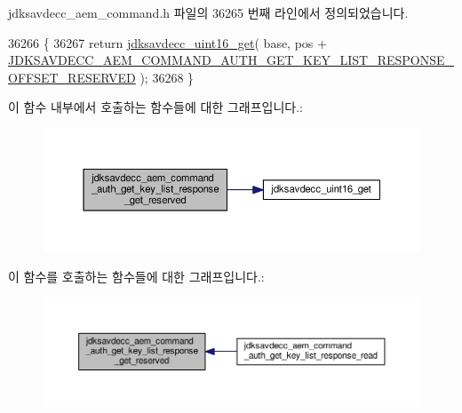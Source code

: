 jdksavdecc\+\_\+aem\+\_\+command.\+h 파일의 36265 번째 라인에서 정의되었습니다.


\begin{DoxyCode}
36266 \{
36267     \textcolor{keywordflow}{return} \hyperlink{group__endian_ga3fbbbc20be954aa61e039872965b0dc9}{jdksavdecc\_uint16\_get}( base, pos + 
      \hyperlink{group__command__auth__get__key__list__response_gac34c30ffeaf37c7057072f996929f1e6}{JDKSAVDECC\_AEM\_COMMAND\_AUTH\_GET\_KEY\_LIST\_RESPONSE\_OFFSET\_RESERVED}
       );
36268 \}
\end{DoxyCode}


이 함수 내부에서 호출하는 함수들에 대한 그래프입니다.\+:
\nopagebreak
\begin{figure}[H]
\begin{center}
\leavevmode
\includegraphics[width=350pt]{group__command__auth__get__key__list__response_ga3a8d0ff5de5601080c9f4af749d445ff_cgraph}
\end{center}
\end{figure}




이 함수를 호출하는 함수들에 대한 그래프입니다.\+:
\nopagebreak
\begin{figure}[H]
\begin{center}
\leavevmode
\includegraphics[width=350pt]{group__command__auth__get__key__list__response_ga3a8d0ff5de5601080c9f4af749d445ff_icgraph}
\end{center}
\end{figure}


